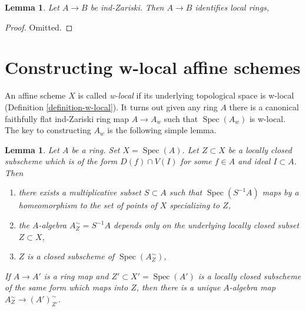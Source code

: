 \documentclass{stacks-project}
\theoremstyle{plain}
\newtheorem{lemma}[subsection]{Lemma}
\theoremstyle{definition}
\theoremstyle{remark}
\numberwithin{equation}{subsection}
\def\Spec{\mathop{\mathrm{Spec}}}
\begin{document}
\begin{lemma}
\label{lemma-ind-zariski-implies}
Let $A \to B$ be ind-Zariski. Then $A \to B$ identifies local rings,
\end{lemma}

\begin{proof}
Omitted.
\end{proof}







\section{Constructing w-local affine schemes}
\label{section-construction}

\noindent
An affine scheme $X$ is called {\it w-local} if its underlying
topological space is w-local (Definition \ref{definition-w-local}).
It turns out given any ring $A$ there is a canonical faithfully
flat ind-Zariski ring map $A \to A_w$ such that $\Spec(A_w)$ is
w-local. The key to constructing $A_w$ is the following simple lemma.

\begin{lemma}
\label{lemma-localization}
Let $A$ be a ring. Set $X = \Spec(A)$. Let $Z \subset X$ be a locally closed
subscheme which is of the form $D(f) \cap V(I)$ for some $f \in A$ and
ideal $I \subset A$. Then
\begin{enumerate}
\item there exists a multiplicative subset $S \subset A$ such that
$\Spec(S^{-1}A)$ maps by a homeomorphism to the set of points of $X$
specializing to $Z$,
\item the $A$-algebra $A_Z^\sim = S^{-1}A$ depends only on
the underlying locally closed subset $Z \subset X$,
\item $Z$ is a closed subscheme of $\Spec(A_Z^\sim)$,
\end{enumerate}
If $A \to A'$ is a ring map and $Z' \subset X' = \Spec(A')$ is a
locally closed subscheme of the same form which maps into $Z$,
then there is a unique $A$-algebra map
$A_Z^\sim \to (A')_{Z'}^\sim$.
\end{lemma}
\end{document}
